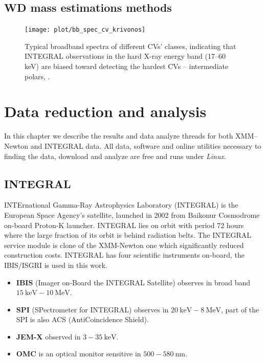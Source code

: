 \documentclass[oneside,a4paper,11pt]{report}
\begin{document}
\section{WD mass estimations methods}
\begin{figure}[hbt]
\centering
\texttt{[image: plot/bb\_spec\_cv\_krivonos]}
\caption{Typical broadband spectra of different CVs' classes, indicating that INTEGRAL observations in 
the hard X-ray energy band (17--60 keV) are biased toward detecting the hardest CVs -- intermediate polars, 
\citet{2008A&A...489.1121R}.}
\label{kriv_1} 
\end{figure}



\chapter{Data reduction and analysis}
In this chapter we describe the results and data analyze threads for both XMM--Newton and INTEGRAL data. 
All data, software and online utilities necessary to finding the data, download and analyze are free 
and runs under \textit{Linux}.  

\section{INTEGRAL}
INTErnational Gamma-Ray Astrophysics Laboratory (INTEGRAL) is the European Space Agency's satellite, 
launched in 2002 from Baikonur Cosmodrome on-board Proton-K launcher. INTEGRAL lies on orbit with 
period 72 hours where the large fraction of its orbit is behind radiation belts. The INTEGRAL service 
module is clone of the XMM-Newton one which significantly reduced construction costs. 
INTEGRAL has four scientific instruments on-board, the IBIS/ISGRI is used in this work. 
\begin{itemize}
 \item \textbf{IBIS} (Imager on-Board the INTEGRAL Satellite) observes in broad band $15\:\mathrm{keV} -
10\:\mathrm{MeV}$.
\item \textbf{SPI} (SPectrometer for INTEGRAL) observes in $20\:\mathrm{keV}-8\:\mathrm{MeV}$, part of the SPI is
also ACS (AntiCoincidence Shield).
\item \textbf{JEM-X} observed in $3 - 35\:\mathrm{keV}$.
\item \textbf{OMC} is an optical monitor sensitive in $500-580\:\mathrm{nm}$.
\end{itemize}
\end{document}
